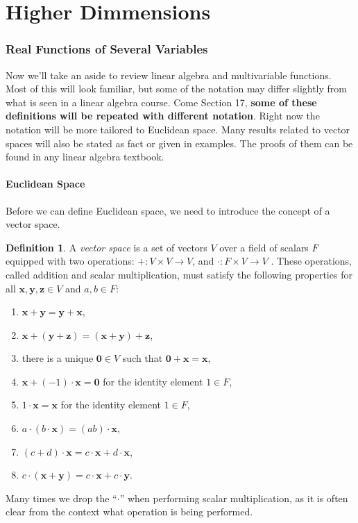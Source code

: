 \documentclass{article}
\newcommand{\x}{\mathbf{x}}
\newcommand{\y}{\mathbf{y}}
\newcommand{\z}{\mathbf{z}}
\newcommand{\ze}{\mathbf{0}}
\theoremstyle{definition}
\newtheorem{definition}{Definition}[section]
\begin{document}
	\part{Higher Dimmensions}
	
	\section{Real Functions of Several Variables}
	Now we'll take an aside to review linear algebra and multivariable functions. Most of this will look familiar, but some of the notation may differ slightly from what is seen in a linear algebra course. Come Section 17, \textbf{some of these definitions will be repeated with different notation}. Right now the notation will be more tailored to Euclidean space. Many results related to vector spaces will also be stated as fact or given in examples. The proofs of them can be found in any linear algebra textbook. 
	\subsection{Euclidean Space}
	Before we can define Euclidean space, we need to introduce the concept of a vector space. 
	\begin{definition}\label{def}
		A \textit{\color{red}vector space} is a set of vectors $ V $ over a field of scalars $ F $ equipped with two operations: $ +:V\times V\to V $, and $ \cdot:F\times V\to V $ . These operations, called addition and scalar multiplication, must satisfy the following properties for all $ \x,\y,\mathbf{z}\in V $ and $ a,b\in F $:
		\begin{enumerate}
			\item $ \x+\y=\y+\x $,
			\item $ \x+(\y+\z)=(\x+\y)+\z $,
			\item there is a unique $ \mathbf{0}\in V $ such that $ \ze+\x=\x $,
			\item $ \x+(-1)\cdot\x=\ze $ for the identity element $ 1\in F $,
			\item $ 1\cdot\x=\x $ for the identity element $ 1\in F $,
			\item $ a\cdot(b\cdot\x)=(ab)\cdot\x $,
			\item $ (c+d)\cdot\x=c\cdot\x+d\cdot\x $,
			\item $ c\cdot(\x+\y)=c\cdot\x+c\cdot\y $.
		\end{enumerate}
	\end{definition}
	Many times we drop the ``$ \cdot $'' when performing scalar multiplication, as it is often clear from the context what operation is being performed. 
	
\end{document}
